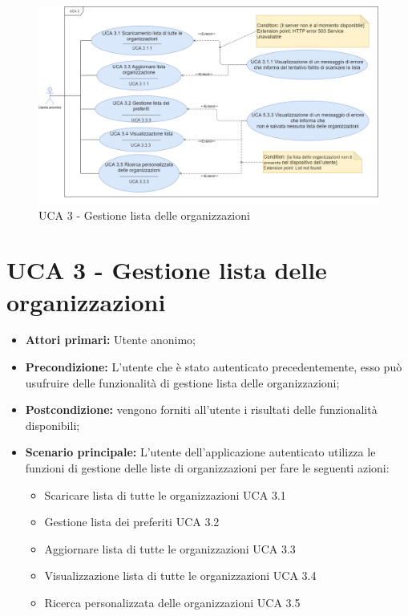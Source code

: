 \newpage
\begin{figure}[h]
	\centering
	\caption{UCA 3 - Gestione lista delle organizzazioni}
	\includegraphics[scale=0.33]{sezioni/UseCase/Immagini/UCA3.png}
\end{figure}
\section{UCA 3 - Gestione lista delle organizzazioni}%
\begin{itemize}
\item \textbf{Attori primari:} Utente anonimo;
\item \textbf{Precondizione:} L’utente che è stato autenticato precedentemente, esso può usufruire delle funzionalità di gestione lista delle organizzazioni;
\item \textbf{Postcondizione:} vengono forniti all’utente i risultati delle funzionalità disponibili;
\item \textbf{Scenario principale:} L’utente dell’applicazione autenticato utilizza le funzioni di gestione delle liste di organizzazioni per fare le seguenti azioni:
	\begin{itemize}
		\item Scaricare lista di tutte le organizzazioni UCA 3.1
		\item Gestione lista dei preferiti UCA 3.2
		\item Aggiornare lista di tutte le organizzazioni UCA 3.3
		\item Visualizzazione lista di tutte le organizzazioni UCA 3.4
		\item Ricerca personalizzata delle organizzazioni UCA 3.5
	\end{itemize}
\end{itemize}

